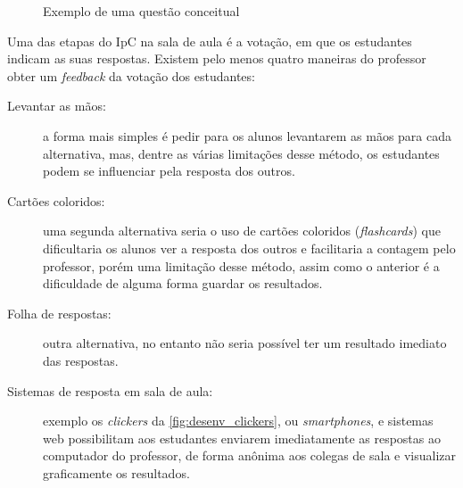 \begin{figure}[t]
  \centering
  \caption{Exemplo de uma questão conceitual}
\end{figure}

Uma das etapas do IpC na sala de aula é a votação, em que os estudantes indicam
as suas respostas. Existem pelo menos quatro maneiras \cite{Crouch2007} do professor
obter um \textit{feedback} da votação dos estudantes:

\begin{description}
  \item[Levantar as mãos:] a forma mais simples é pedir para os alunos levantarem as mãos para cada alternativa,
  mas, dentre as várias limitações desse método, os estudantes podem se influenciar pela resposta dos outros.
  \item[Cartões coloridos:] uma segunda alternativa seria o uso de
  cartões coloridos (\textit{flashcards}) que dificultaria os alunos ver a resposta
  dos outros e facilitaria a contagem pelo professor, porém uma limitação desse método,
  assim como o anterior é a dificuldade de alguma forma guardar os resultados.
  \item[Folha de respostas:] outra alternativa, no entanto não seria possível ter
  um resultado imediato das respostas.
  \item[Sistemas de resposta em sala de aula:] exemplo os \textit{clickers} da \autoref{fig:desenv_clickers}, ou \textit{smartphones},
  e sistemas web possibilitam aos estudantes enviarem imediatamente as respostas ao
  computador do professor, de forma anônima aos colegas de sala e visualizar graficamente
  os resultados.
\end{description}


